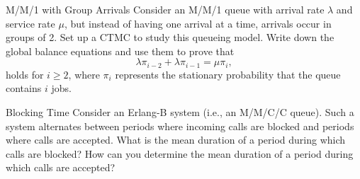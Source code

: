 \begin{problem}{M/M/1 with Group Arrivals}
Consider an M/M/1 queue with arrival rate \( \lambda \) and service rate \( \mu \), but instead of having one arrival at a time, arrivals occur in groups of 2. Set up a CTMC to study this queueing model. Write down the global balance equations and use them to prove that
   \[
   \lambda \pi_{i-2} + \lambda \pi_{i-1} = \mu \pi_i,
   \]
   holds for \( i \geq 2 \), where \( \pi_i \) represents the stationary probability that the queue contains \( i \) jobs.
\end{problem}

\begin{problem}{Blocking Time}
Consider an Erlang-B system (i.e., an M/M/C/C queue). Such a system alternates between periods where incoming calls are blocked and periods where calls are accepted. What is the mean duration of a period during which calls are blocked? How can you determine the mean duration of a period during which calls are accepted?
\end{problem}
